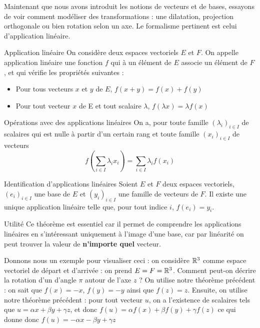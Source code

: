 \documentclass{classe}
\begin{document}
Maintenant que nous avons introduit les notions de vecteurs et de bases, essayons de voir comment modéliser des transformations : une dilatation, projection orthogonale ou bien rotation selon un axe. Le formalisme pertinent est celui d'application linéaire.

\begin{définition}{Application linéaire}{}
On considère deux espaces vectoriels $E$ et $F$. On appelle application linéaire une fonction $f$ qui à un élément de $E$ associe un élément de $F$, et qui vérifie les propriétés suivantes :
\begin{itemize}
	\item Pour tous vecteurs $x$ et $y$ de $E$, $f(x+y) = f(x)+f(y)$
	\item Pour tout vecteur $x$ de E et tout scalaire $\lambda$, $f(\lambda x) = \lambda f(x)$
\end{itemize}
\end{définition}

\begin{propositionfr}{Opérations avec des applications linéaires}{}
On a, pour toute famille $(\lambda_i)_{i\in I}$ de scalaires qui est nulle à partir d'un certain rang et toute famille $(x_i)_{i\in I}$ de vecteurs
$$f\left(\sum_{i\in I}\lambda_i x_i\right) = \sum_{i\in I}\lambda_i f(x_i)$$
\end{propositionfr}

\begin{théorème}{Identification d'applications linéaires}{}
Soient $E$ et $F$ deux espaces vectoriels, $(e_i)_{i\in I}$ une base de $E$ et $(y_i)_{i\in I}$ une famille de vecteurs de $F$. Il existe une unique application linéaire telle que, pour tout indice $i$, $f(e_i) = y_i$.
\end{théorème}



\begin{remarque}{Utilité}{}
Ce théorème est essentiel car il permet de comprendre les applications linéaires en s'intéressant uniquement à l'image d'une base, car par linéarité on peut trouver la valeur de \textbf{n'importe quel} vecteur.
\end{remarque}

Donnons nous un exemple pour visualiser ceci : on considère $\mathbb{R}^3$ comme espace vectoriel de départ et d'arrivée : on prend $E = F = \mathbb{R}^3$. Comment peut-on décrire la rotation d'un d'angle $\pi$ autour de l'axe $z$ ? On utilise notre théorème précédent : on sait que $f(x) = -x$, $f(y) = -y$ ainsi que $f(z) = z$. Ensuite, on utilise notre théorème précédent : pour tout vecteur $u$, on a l'existence de scalaires tels que $u = \alpha x + \beta y + \gamma z$, et donc $f(u) = \alpha f(x) + \beta f(y) + \gamma f(z)$ ce qui donne donc $f(u) = -\alpha x - \beta y + \gamma z$

\end{document}
